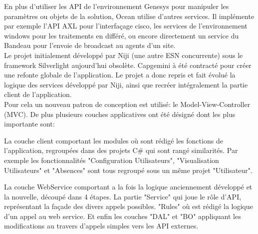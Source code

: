 \documentclass{rapport}
\begin{document}
En plus d'utiliser les API de l'environnement Genesys pour manipuler les paramètres ou objets de la solution, Ocean utilise d'autres services. Il implémente par exemple l'API AXL pour l'interfaçage cisco, les services de l'environnement windows pour les traitements en différé, ou encore directement un service du Bandeau pour l'envoie de broadcast au agents d'un site.\\

Le projet initialement développé par Niji (une autre ESN concurrente) sous le framework Silverlight aujourd'hui obsolète. Capgemini à été contracté pour créer une refonte globale de l'application. Le projet a donc repris et fait évolué la logique des services développé par Niji, ainsi que recréer intégralement la partie client de l'application.\\
Pour cela un nouveau patron de conception est utilisé: le Model-View-Controller (MVC). De plus plusieurs couches applicatives ont été désigné dont les plus importante sont:\\

\begin{minipage}{0.35\textwidth}
\end{minipage}
\begin{minipage}{0.55\textwidth}
La couche client comportant les modules où sont rédigé les fonctions de l'application, regroupées dans des projets C\# qui sont rangé similarités. Par exemple les fonctionnalités "Configuration Utilisateurs", "Visualisation Utilisateurs" et "Absences" sont tous regroupé sous un même projet "Utilisateur".
\end{minipage}
\vspace{5mm} %

\begin{minipage}{0.35\textwidth}
\end{minipage}
\begin{minipage}{0.55\textwidth}
La couche WebService comportant a la fois la logique anciennement développé et la nouvelle, découpé dans 4 étapes. La partie "Service" qui joue le rôle d'API, représentant la façade des divers appels possibles. "Rules" où est rédigé la logique d'un appel au web service. Et enfin les couches "DAL" et "BO" appliquant les modifications au travers d'appels simples vers les API externes.
\end{minipage}
\vspace{5mm} %
\\
\end{document}
